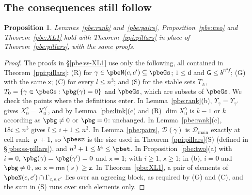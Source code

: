 \documentclass[10pt]{amsart}
\newtheorem{proposition}[theorem]{Proposition}
\theoremstyle{definition}
\theoremstyle{remark}
\providecommand{\auU}{\mathrm U}
\providecommand{\aubar}[1]{\overline{#1}}
\providecommand{\pbDmain}{\mathcal D_{\mathrm{main}}}
\begin{document}
\subsection{The consequences still follow}\label{ppi:ss-check}

\begin{proposition}\label{ppi:check}
Lemmas~\ref{pbe:rank} and~\ref{pbe:pairs}, Proposition~\ref{pbe:two} and Theorem~\ref{pbe:XL1} hold
with Theorem~\ref{ppi:pillars} in place of Theorem~\ref{pbe:pillars}, with the same proofs.
\end{proposition}
\begin{proof}
The proofs in \S\ref{pbe:ss-XL1} use only the following, all contained in
Theorem~\ref{ppi:pillars}: (R) for $\gamma\in\pbeN(c,c')\subseteq\pbeGs$; $1\le\mathsf d$ and $\mathsf
G\le b^{n^3f}$; (G) with the same $\mathsf x$; (C) for every $l\le n^3$; and (S) for the stable sets
$T_\Lambda$, $T_0=\{\gamma\in\pbeGs:\pbg(\gamma)=0\}$ and $\pbeGs$, which are subsets of $\pbeGs$.
We check the points where the definitions enter. In Lemma~\ref{pbe:rank}(b), $\Upsilon_\gamma=
\Upsilon_{\gamma'}$ gives $X_0^\gamma=X_0^{\gamma'}$, and by Lemma~\ref{pbe:link}(c) and (R) $\dim
X_0^\gamma$ is $k-1$ or $k$ according as $\pbg\ne0$ or $\pbg=0$: unchanged. In
Lemma~\ref{pbe:rank}(c), $18i\le n^3$ gives $l\le i+1\le n^3$. In Lemma~\ref{pbe:pairs}, $\mathcal
D(\gamma)$ is $\pbDmain$ exactly at cell rank $\varrho+1$, so $\pbesz$ is the size used in Theorem~\ref{ppi:pillars}(S) (defined in \S\ref{pbe:ss-pillars}), and
$n^3+1\le b^4\le\pbet$. In Proposition~\ref{pbe:two}(a) with $i=0$, $\pbg(\gamma)=\pbg(\gamma')=0$ and
$\mathsf x=1$; with $i\ge1$, $\mathsf x\ge1$; in (b), $i=0$ and $\pbg\ne0$, so $\mathsf x=\mathsf{mn}(s)
\ge\mathsf z$. In Theorem~\ref{pbe:XL1}, a pair of elements of $\pbeN(c,c')\cap\Gamma_{c,s,c'}$ lies
over an agreeing block, as required by (G) and (C), and the sum in (S) runs over such elements only.
\end{proof}



\providecommand{\auU}{\mathrm U}
\providecommand{\aubar}[1]{\overline{#1}}
\providecommand{\pbvol}{\operatorname{vol}}
\providecommand{\pbip}[2]{\langle#1,#2\rangle}
\providecommand{\pbW}{\mathbb W}
\providecommand{\pbel}{\ell}
\providecommand{\pbeB}{\mathsf B}
\providecommand{\pdsK}{\mathbf K}
\providecommand{\pdsg}{\mathfrak g}
\providecommand{\pdsm}{m}
\providecommand{\pdsHS}[1]{\|#1\|_{2}}
\providecommand{\pcoD}{\mathsf D}
\providecommand{\pbpF}[1]{\|#1\|_{\mathrm F}}
\providecommand{\pbptr}{\operatorname{tr}}
\providecommand{\pbpct}{\operatorname{ct}}
\providecommand{\pbpCT}{\operatorname{CT}}
\providecommand{\pbpQ}{\mathcal Q}
\providecommand{\pbpLam}{\widehat\Lambda}
\providecommand{\pbpst}{\tilde\sigma}
\providecommand{\pbpI}{\mathsf I}
\end{document}

